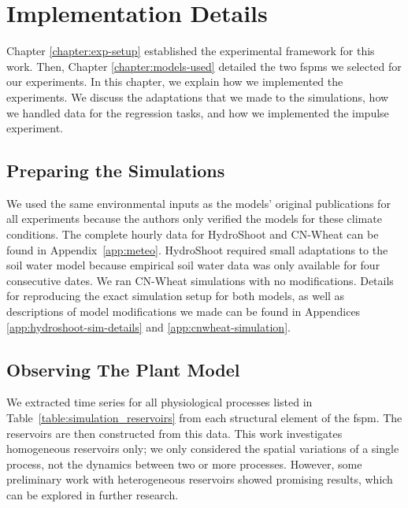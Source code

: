 
\chapter{Implementation Details} \label{chapter:methods}

Chapter \ref{chapter:exp-setup} established the experimental framework for this work.
Then, Chapter \ref{chapter:models-used} detailed the two \acrshort{fspm}s we selected for our experiments.
In this chapter, we explain how we implemented the experiments.
We discuss the adaptations that we made to the simulations, how we handled data for the regression tasks, and how we implemented the impulse experiment.


\section{Preparing the Simulations}

We used the same environmental inputs as the models' original publications for all experiments because the authors only verified the models for these climate conditions.
The complete hourly data for HydroShoot and CN-Wheat can be found in \mbox{Appendix \ref{app:meteo}}.
HydroShoot required small adaptations to the soil water model because empirical soil water data was only available for four consecutive dates. 
We ran CN-Wheat simulations with no modifications.
Details for reproducing the exact simulation setup for both models, as well as descriptions of model modifications we made can be found in Appendices \ref{app:hydroshoot-sim-details} and \ref{app:cnwheat-simulation}.


\section{Observing The Plant Model}

We extracted time series for all physiological processes listed in \mbox{Table \ref{table:simulation_reservoirs}} from each structural element of the \acrshort{fspm}.
The reservoirs are then constructed from this data.
This work investigates homogeneous reservoirs only; we only considered the spatial variations of a single process, not the dynamics between two or more processes. 
However, some preliminary work with heterogeneous reservoirs showed promising results, which can be explored in further research.

